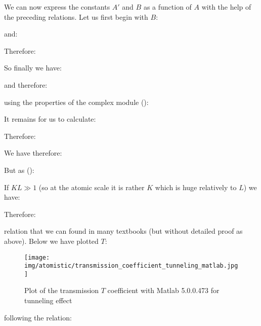 	
	\begin{tcolorbox}[colframe=black,colback=white,sharp corners]
	We can now express the constants $A'$ and $B$ as a function of $A$ with the help of the preceding relations. Let us first begin with $B$:
	
	and:
	
	Therefore:
	
	So finally we have:
	
	and therefore:
	\end{tcolorbox}
	
	
	\begin{tcolorbox}[colframe=black,colback=white,sharp corners]
	
	using the properties of the complex module ():
	
	It remains for us to calculate:
	
	Therefore:
	
	\end{tcolorbox}
	
	\begin{tcolorbox}[colframe=black,colback=white,sharp corners]
	
	We have therefore:
	
	But as ():
	
	If $KL\gg 1$ (so at the atomic scale it is rather $K$ which is huge relatively to $L$) we have:
	
	Therefore:
	
	relation that we can found in many textbooks (but without detailed proof as above). Below we have plotted $T$:
	\begin{figure}[H]
		\centering
		\texttt{[image: img/atomistic/transmission\_coefficient\_tunneling\_matlab.jpg]}	
		\caption{Plot of the transmission $T$ coefficient with Matlab 5.0.0.473 for tunneling effect}
	\end{figure}
	\end{tcolorbox}
	
	\begin{tcolorbox}[colframe=black,colback=white,sharp corners]
	following the relation:
	
	\end{tcolorbox}
	
